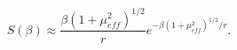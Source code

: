 \begin{equation}
S\left(\beta \right)\approx \frac{\beta \left(1+\mu _{eff}^{2}\right)^{1/2}}{r}e^{-\beta \left(1+\mu _{eff}^{2}\right)^{1/2}/r}.\label{lowTentropy}\end{equation}

